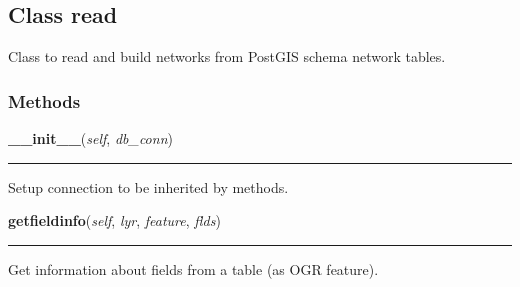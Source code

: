 

\subsection{Class read}

    \label{nx_pgnet:read}
Class to read and build networks from PostGIS schema network tables.



  \subsubsection{Methods}

    \label{nx_pgnet:read:__init__}

    \vspace{0.5ex}

\hspace{.8\funcindent}\begin{boxedminipage}{\funcwidth}

    \raggedright \textbf{\_\_init\_\_}(\textit{self}, \textit{db\_conn})

    \vspace{-1.5ex}

    \rule{\textwidth}{0.5\fboxrule}
\setlength{\parskip}{2ex}
    Setup connection to be inherited by methods.

\setlength{\parskip}{1ex}
    \end{boxedminipage}

    \label{nx_pgnet:read:getfieldinfo}

    \vspace{0.5ex}

\hspace{.8\funcindent}\begin{boxedminipage}{\funcwidth}

    \raggedright \textbf{getfieldinfo}(\textit{self}, \textit{lyr}, \textit{feature}, \textit{flds})

    \vspace{-1.5ex}

    \rule{\textwidth}{0.5\fboxrule}
\setlength{\parskip}{2ex}
    Get information about fields from a table (as OGR feature).

\setlength{\parskip}{1ex}
    \end{boxedminipage}

